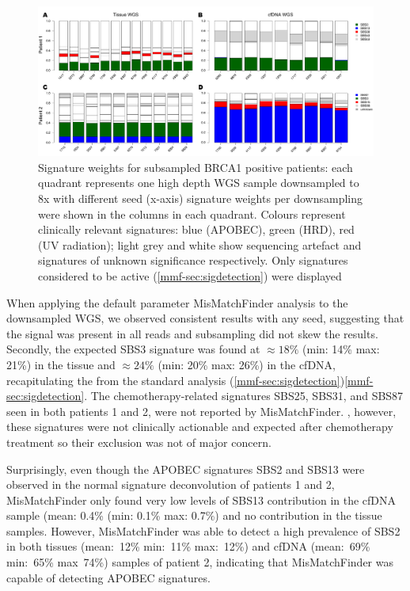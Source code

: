 \begin{figure}[hb]
\centering
\includegraphics[width=.99\linewidth]{Figures/MisMatchFinder/brca1BarPlots.pdf}
\caption[Signature weights for subsampled BRCA1 positive patients]{Signature weights for subsampled BRCA1 positive patients: each quadrant represents one high depth WGS sample downsampled to 8x with different seed (x-axis) signature weights per downsampling were shown in the columns in each quadrant. Colours represent clinically relevant signatures: blue (APOBEC), green (HRD), red (UV radiation); light grey and white show sequencing artefact and signatures of unknown significance respectively. Only signatures considered to be active (\autoref{mmf-sec:sigdetection}) were displayed}\label{fig:mmf-mbcbBarPlot}
\end{figure}

When applying the default parameter MisMatchFinder analysis to the downsampled WGS, we observed consistent results with any seed, suggesting that the signal was present in all reads and subsampling did not skew the results. Secondly, the expected SBS3 signature was found at $\approx 18\%$ (min: 14\% max: 21\%) in the tissue and $\approx 24\%$ (min: 20\% max: 26\%) in the cfDNA, recapitulating the  from the standard analysis (\autoref{mmf-sec:sigdetection})\autoref{mmf-sec:sigdetection}\add{)}. The chemotherapy-related signatures SBS25, SBS31, and SBS87 seen in both patients 1 and 2, were not reported by MisMatchFinder. , however, these signatures were not clinically actionable and expected after chemotherapy treatment so their exclusion was not of major concern.

Surprisingly, even though the APOBEC signatures SBS2 and SBS13 were observed in the normal signature deconvolution of patients 1 and 2, MisMatchFinder only found very low levels of SBS13 contribution in the cfDNA sample (mean: 0.4\% (min: 0.1\% max: 0.7\%) and no contribution in the tissue samples. However, MisMatchFinder was able to detect a high prevalence of SBS2 in both tissues (mean:~12\% min:~11\% max:~12\%) and cfDNA (mean:~69\% min:~65\% max~74\%) samples of patient 2, indicating that MisMatchFinder was capable of detecting APOBEC signatures. 

